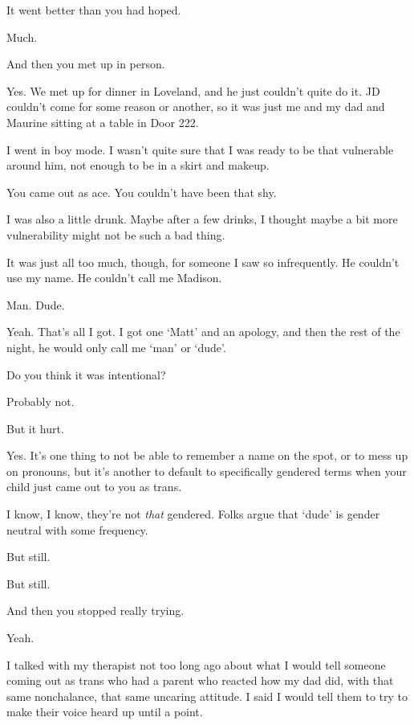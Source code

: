 \begin{paracol}{2}
\begin{leftcolumn}
\begin{ally}
It went better than you had hoped.
\end{ally}
Much.

\begin{ally}
And then you met up in person.
\end{ally}
Yes. We met up for dinner in Loveland, and he just couldn't quite do it. JD couldn't come for some reason or another, so it was just me and my dad and Maurine sitting at a table in Door 222.

I went in boy mode. I wasn't quite sure that I was ready to be that vulnerable around him, not enough to be in a skirt and makeup.

\begin{ally}
You came out as ace. You couldn't have been that shy.
\end{ally}
I was also a little drunk. Maybe after a few drinks, I thought maybe a bit more vulnerability might not be such a bad thing.

It was just all too much, though, for someone I saw so infrequently. He couldn't use my name. He couldn't call me Madison.

\begin{ally}
Man. Dude.
\end{ally}
Yeah. That's all I got. I got one `Matt' and an apology, and then the rest of the night, he would only call me `man' or `dude'.

\begin{ally}
Do you think it was intentional?
\end{ally}
Probably not.

\begin{ally}
But it hurt.
\end{ally}
Yes. It's one thing to not be able to remember a name on the spot, or to mess up on pronouns, but it's another to default to specifically gendered terms when your child just came out to you as trans.

I know, I know, they're not \emph{that} gendered. Folks argue that `dude' is gender neutral with some frequency.

\begin{ally}
But still.
\end{ally}
But still.

\begin{ally}
And then you stopped really trying.
\end{ally}
Yeah.

I talked with my therapist not too long ago about what I would tell someone coming out as trans who had a parent who reacted how my dad did, with that same nonchalance, that same uncaring attitude. I said I would tell them to try to make their voice heard up until a point.


\end{leftcolumn}
\end{paracol}
